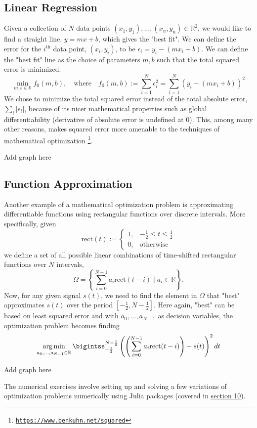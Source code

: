 \documentclass[10pt]{article}
\begin{document}
\subsection{Linear Regression}
Given a collection of $N$ data points $(x_1, y_1), \ldots, (x_n, y_n) \in \mathbb{R}^2$, we would like to find a straight line, $y = mx + b$,  which gives the "best fit". We can define the error for the $i^{\text{th}}$ data point,  $(x_i, y_i)$, to be $\epsilon_i = y_i - (mx_i + b)$. We can define the "best fit" line as the choice of parameters $m, b$ such that the total squared error is minimized.
\[
    \min_{m, b \in \mathbb{R}} f_0(m, b), \quad \text{where} \quad f_0(m, b) := \sum_{i=1}^{N} \epsilon_i^2 = \sum_{i=1}^N (y_i - (mx_i + b))^2
\]
We chose to minimize the total squared error instead of the total absolute error, $\sum_i|\epsilon_i|$, because of its nicer mathematical properties such as global differentiability (derivative of absolute error is undefined at 0). This, among many other reasons, makes squared error more amenable to the techniques of mathematical optimization \footnote{\href{https://www.benkuhn.net/squared}{\texttt{https://www.benkuhn.net/squared}}}.

\begin{mdframed}[backgroundcolor=red]
    Add graph here
\end{mdframed}

\subsection{Function Approximation}
Another example of a mathematical optimization problem is approximating differentiable functions using rectangular functions over discrete intervals. More specifically, given 
\[
    \text{rect}(t) := 
    \begin{cases} 
      1, & -\frac{1}{2} \leq t \leq \frac{1}{2} \\
      0, & \text{otherwise} 
   \end{cases}
\]
we define a set of all possible linear combinations of time-shifted rectangular functions over $N$ intervals,
\[
    \Omega = \left\{\sum_{i = 0}^{N-1} a_i\text{rect}(t-i) \mid a_i \in \mathbb{R}\right\}.
\]
Now, for any given signal $s(t)$, we need to find the element in $\Omega$ that "best" approximates $s(t)$ over the period $[-\frac{1}{2}, N-\frac{1}{2}]$. Here again, "best" can be based on least squared error and with $a_0, \ldots, a_{N-1}$ as decision variables, the optimization problem becomes finding
\[
    \argmin_{a_0, \ldots, a_{N-1}\in \mathbb{R}} \bigintss_{-\frac{1}{2}}^{N-\frac{1}{2}}\left( \left(\sum_{i=0}^{N-1}a_i\text{rect}(t-i)\right) - s(t) \right)^2 dt
\]
\begin{mdframed}[backgroundcolor=red]
    Add graph here
\end{mdframed}
The numerical exercises involve setting up and solving a few variations of optimization problems numerically using Julia packages (covered in \hyperlink{section.10}{section 10}).
\end{document}
